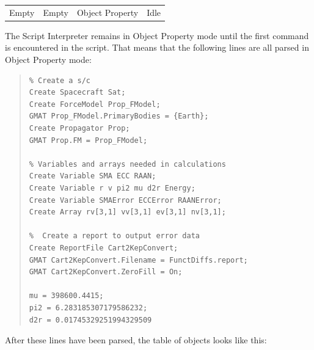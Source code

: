 \begin{center}
\tablelasttail{\hline}
\begin{supertabular}{|m{1.3in}|m{1.3in}|m{1.3in}|m{1.3in}|}
Empty &
Empty &
Object Property &
Idle\\
\end{supertabular}
\end{center}

The Script Interpreter remains in Object Property mode until the first command is encountered in the
script.  That means that the following lines are all parsed in Object Property mode:

\begin{quote}
\begin{verbatim}
% Create a s/c
Create Spacecraft Sat;
Create ForceModel Prop_FModel;
GMAT Prop_FModel.PrimaryBodies = {Earth};
Create Propagator Prop;
GMAT Prop.FM = Prop_FModel;

% Variables and arrays needed in calculations
Create Variable SMA ECC RAAN;
Create Variable r v pi2 mu d2r Energy;
Create Variable SMAError ECCError RAANError;
Create Array rv[3,1] vv[3,1] ev[3,1] nv[3,1];

%  Create a report to output error data
Create ReportFile Cart2KepConvert;
GMAT Cart2KepConvert.Filename = FunctDiffs.report;
GMAT Cart2KepConvert.ZeroFill = On;

mu = 398600.4415;
pi2 = 6.283185307179586232;
d2r = 0.01745329251994329509
\end{verbatim}
\end{quote}

\noindent After these lines have been parsed, the table of objects looks like this:


